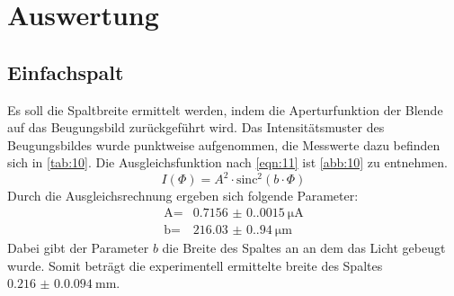 \section{Auswertung}
\subsection{Einfachspalt}
Es soll die Spaltbreite ermittelt werden, indem die Aperturfunktion der Blende
auf das Beugungsbild zurückgeführt wird. Das Intensitätsmuster des Beugungsbildes
wurde punktweise aufgenommen, die Messwerte dazu befinden sich in \autoref{tab:10}.
Die Ausgleichsfunktion nach \autoref{eqn:11} ist \autoref{abb:10} zu entnehmen.
\begin{equation}
    \label{eqn:11}
    I\left(\Phi\right) = A^2 \cdot \text{sinc}^2\left(b \cdot \Phi\right) 
\end{equation}
\noindent Durch die Ausgleichsrechnung ergeben sich folgende Parameter:
\begin{align}
    \text{A} = & \qty{0.7156(0.0015)}{\micro\ampere} \\
    \text{b} = & \qty{216.03(0.94)}{\micro\meter}
\end{align}
Dabei gibt der Parameter $b$ die Breite des Spaltes an an dem das Licht gebeugt
wurde. Somit beträgt die experimentell ermittelte breite des Spaltes 
$\qty{0.216(0.0094)}{\milli\meter}$.
